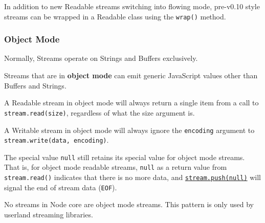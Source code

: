 \begin{Shaded}
\begin{Highlighting}[]
\NormalTok{(}

  \NormalTok{(}\NormalTok{, }\NormalTok{() \{}
    \NormalTok{(}\NormalTok{);}
  \NormalTok{\});}

  \NormalTok{();}

\NormalTok{(}\NormalTok{);}
\end{Highlighting}
\end{Shaded}

In addition to new Readable streams switching into flowing mode,
pre-v0.10 style streams can be wrapped in a Readable class using the
\texttt{wrap()} method.

\subsubsection{Object Mode}

Normally, Streams operate on Strings and Buffers exclusively.

Streams that are in \textbf{object mode} can emit generic JavaScript
values other than Buffers and Strings.

A Readable stream in object mode will always return a single item from a
call to \texttt{stream.read(size)}, regardless of what the size argument
is.

A Writable stream in object mode will always ignore the
\texttt{encoding} argument to \texttt{stream.write(data, encoding)}.

The special value \texttt{null} still retains its special value for
object mode streams. That is, for object mode readable streams,
\texttt{null} as a return value from \texttt{stream.read()} indicates
that there is no more data, and
\hyperref[stream\_readable\_push\_chunk\_encoding]{\texttt{stream.push(null)}}
will signal the end of stream data (\texttt{EOF}).

No streams in Node core are object mode streams. This pattern is only
used by userland streaming libraries.

